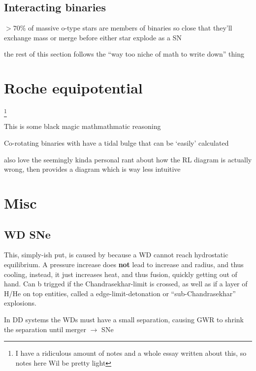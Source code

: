 \documentclass{article}
\begin{document}
\subsection{Interacting binaries}
\begin{list}{-}{}
\item \(> 70\%\) of massive o-type stars are members of binaries so close that they'll exchange mass or merge before either star explode as a SN

\end{list}
the rest of this section follows the ``way too niche of math to write down'' thing

\section{Roche equipotential}\footnote{I have a ridiculous amount of notes and a whole essay written about this, so notes here Wil be pretty light}

\begin{list}{-}{}
\item This is some black magic mathmathmatic reasoning 
\item Co-rotating binaries with have a tidal bulge that can be `easily' calculated
\item also love the seemingly kinda personal rant about how the RL diagram is actually wrong, then provides a diagram which is way less intuitive  
\item 
\end{list}
\setcounter{section}{-1}
\section{Misc}
\subsection{WD SNe}\label{WD-SNe}
\begin{list}{-}{}
\item This, simply-ish put, is caused by because a WD cannot reach hydrostatic equilibrium. A pressure increase does \textbf{not} lead to increase and radius, and thus cooling, instead, it just increases heat, and thus fusion, quickly getting out of hand. Can b trigged if the \gls{Chandrasekhar-limit} is crossed, as well as if a layer of H/He on top entities, called a \gls{edge-limit-detonation} or ``sub-Chandrasekhar'' explosions.
\item In \gls{DD} systems the WDs must have a small separation, causing \gls{GWR} to shrink the separation until merger \(\rightarrow\) SNe
\end{list}
\clearpage

\printglossaries
\end{document}
